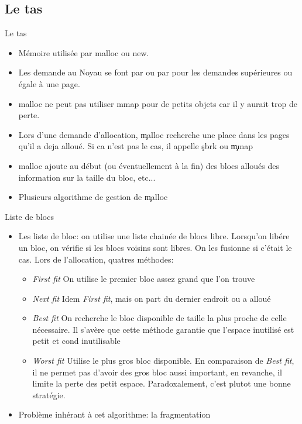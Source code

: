\subsection{Le tas}

\begin{frame}[fragile=singleslide]{Le tas}
  \begin{itemize}
  \item Mémoire utilisée par malloc ou new.
  \item  Les  demande  au  Noyau  se font  par    ou  par
     pour les demandes supérieures ou égale à une page.
  \item malloc ne peut pas utiliser  mmap pour de petits objets car il
    y aurait trop de perte.
  \item  Lors  d'une demande  d'allocation,  \c{malloc} recherche  une
    place dans les pages qu'il a  deja alloué. Si ca n'est pas le cas,
    il appelle \c{sbrk} ou \c{mmap}
  \item malloc ajoute au début  (ou éventuellement à la fin) des blocs
    alloués des information sur la taille du bloc, etc...
  \item Plusieurs algorithme de gestion de \c{malloc}
  \end{itemize}
\end{frame}

\begin{frame}[fragile=singleslide]{Liste de blocs}
  \begin{itemize}
  \item  Les liste  de bloc:  on utilise  une liste  chainée  de blocs
    libre. Lorsqu'on libére  un bloc, on vérifie si  les blocs voisins
    sont  libres.   On  les  fusionne  si c'était  le  cas.   Lors  de
    l'allocation, quatres méthodes:
    \begin{itemize}
    \item \emph{First fit} On utilise  le premier bloc assez grand que
      l'on trouve
    \item  \emph{Next fit}  Idem  \emph{First fit},  mais  on part  du
      dernier endroit ou a alloué
    \item \emph{Best fit} On recherche le bloc disponible de taille la
      plus proche  de celle nécessaire.  Il s'avère  que cette méthode
      garantie que l'espace inutilisé est petit et cond inutilisable
    \item \emph{Worst  fit} Utilise le  plus gros bloc  disponible. En
      comparaison  de \emph{Best fit},  il ne  permet pas  d'avoir des
      gros bloc aussi  important, en revanche, il limite  la perte des
      petit espace.  Paradoxalement, c'est plutot une bonne stratégie.
    \end{itemize}
  \item Problème inhérant à cet algorithme: la fragmentation
  \end{itemize}
\end{frame}

